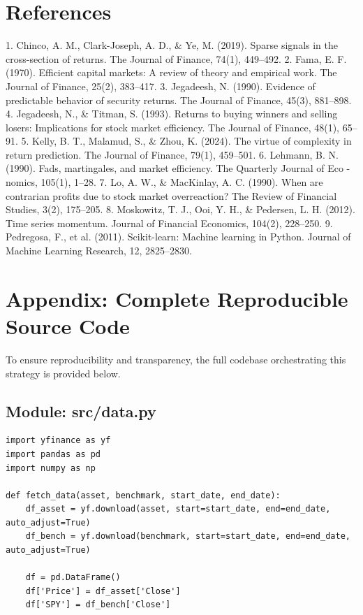 \documentclass[12pt, a4paper]{article}
\begin{document}
{\section{References}
1. Chinco, A. M., Clark-Joseph, A. D., \& Ye, M. (2019). Sparse signals in the cross-section of returns. 
The Journal of Finance, 74(1), 449–492.
2. Fama, E. F. (1970). Efficient capital markets: A review of theory and empirical work. The Journal 
of Finance, 25(2), 383–417.
3. Jegadeesh, N. (1990). Evidence of predictable behavior of security returns. The Journal of Finance, 
45(3), 881–898.
4. Jegadeesh, N., \& Titman, S. (1993). Returns to buying winners and selling losers: Implications for 
stock market efficiency. The Journal of Finance, 48(1), 65–91.
5. Kelly, B. T., Malamud, S., \& Zhou, K. (2024). The virtue of complexity in return prediction. The 
Journal of Finance, 79(1), 459–501.
6. Lehmann, B. N.  (1990). Fads, martingales, and market efficiency. The Quarterly Journal of Eco -
nomics, 105(1), 1–28.
7. Lo, A. W., \& MacKinlay, A. C. (1990). When are contrarian profits due to stock market overreaction? 
The Review of Financial Studies, 3(2), 175–205.
8. Moskowitz, T. J., Ooi, Y. H., \& Pedersen, L. H.  (2012). Time series momentum. Journal of 
Financial Economics, 104(2), 228–250.
9. Pedregosa, F., et al. (2011). Scikit-learn: Machine learning in Python. Journal of Machine Learning 
Research, 12, 2825–2830.




\section{Appendix: Complete Reproducible Source Code}
To ensure reproducibility and transparency, the full codebase orchestrating this strategy is provided below.

\subsection{Module: src/data.py}
\begin{verbatim}
import yfinance as yf
import pandas as pd
import numpy as np

def fetch_data(asset, benchmark, start_date, end_date):
    df_asset = yf.download(asset, start=start_date, end=end_date, auto_adjust=True)
    df_bench = yf.download(benchmark, start=start_date, end=end_date, auto_adjust=True)

    df = pd.DataFrame()
    df['Price'] = df_asset['Close']
    df['SPY'] = df_bench['Close']
    

\end{verbatim}}
\end{document}
